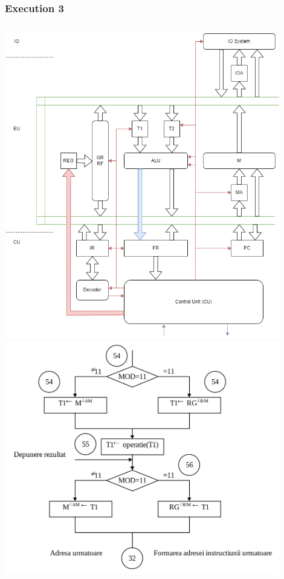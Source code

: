 \begin{frame}
    \frametitle{Execution 3}
    \begin{columns}
    \includegraphics[width=0.9\textwidth]{media/architecture.png}
    \includegraphics[width=0.9\textwidth]{media/cdtree3.png}
    \end{columns}
    \end{frame}



